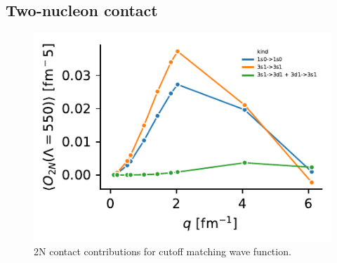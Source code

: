 \documentclass[onecolumn]{revtex4-2}
\begin{document}
\subsection{Two-nucleon contact}
\begin{figure}[htb!]
    \includegraphics{figs/2n-contact.pdf}
    \caption{2N contact contributions for cutoff matching wave function.}
    \label{}
\end{figure}
\end{document}
